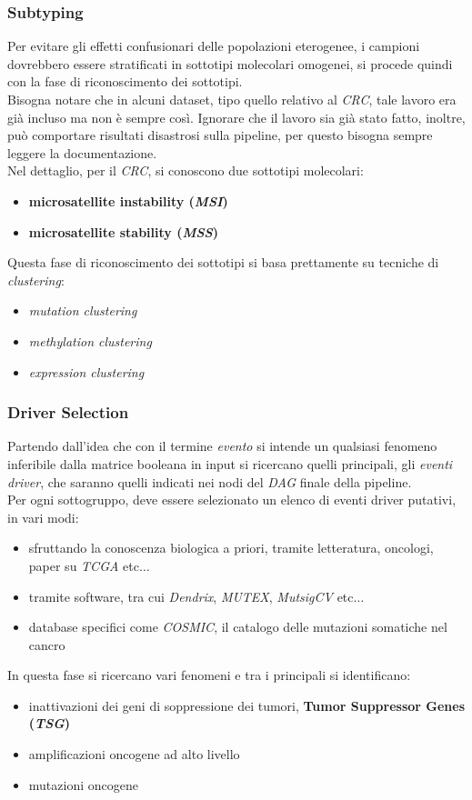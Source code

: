 \documentclass[a4paper,12pt, oneside]{book}
\begin{document}
\subsubsection{Subtyping}
Per evitare gli effetti confusionari delle popolazioni eterogenee, i campioni
dovrebbero essere stratificati in sottotipi molecolari omogenei, si procede
quindi con la fase di riconoscimento dei sottotipi.\\
Bisogna notare che in alcuni dataset, tipo quello relativo al \textit{CRC}, tale
lavoro era già incluso ma non è sempre così. Ignorare che il lavoro sia già
stato fatto, inoltre, può comportare risultati disastrosi sulla pipeline, per
questo bisogna sempre leggere la documentazione.\\
Nel dettaglio, per il \textit{CRC}, si conoscono due sottotipi molecolari:
\begin{itemize}
  \item \textbf{microsatellite instability (\textit{MSI})}
  \item \textbf{microsatellite stability (\textit{MSS})}
\end{itemize}
Questa fase di riconoscimento dei sottotipi si basa prettamente su tecniche di
\textit{clustering}:
\begin{itemize}
  \item \textit{mutation clustering}
  \item \textit{methylation clustering}
  \item \textit{expression clustering}
\end{itemize}
\subsubsection{Driver Selection}
Partendo dall'idea che con il termine \textit{evento} si intende un qualsiasi
fenomeno inferibile dalla matrice booleana in input si ricercano quelli
principali, gli \textit{eventi driver}, che saranno quelli indicati nei nodi del
\textit{DAG} finale della pipeline.\\
Per ogni sottogruppo, deve essere selezionato un elenco di eventi driver
putativi, in vari modi:
\begin{itemize}
  \item sfruttando la conoscenza biologica a priori, tramite letteratura,
  oncologi, paper su \textit{TCGA} etc$\ldots$
  \item tramite software, tra cui \textit{Dendrix}, \textit{MUTEX},
  \textit{MutsigCV} etc$\ldots$
  \item database specifici come \textit{COSMIC}, il catalogo delle mutazioni
  somatiche nel cancro
\end{itemize}
In questa fase si ricercano vari fenomeni e tra i principali si identificano:
\begin{itemize}
  \item inattivazioni dei geni di soppressione dei tumori, \textbf{Tumor
    Suppressor Genes (\textit{TSG})}
  \item amplificazioni oncogene ad alto livello
  \item mutazioni oncogene
\end{itemize}
\end{document}
